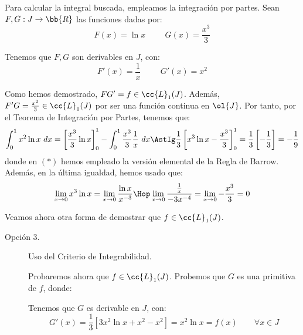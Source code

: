 \begin{ejercicio}
\begin{enumerate}
        Para calcular la integral buscada, empleamos la integración por partes.
        Sean $F,G:J\to \bb{R}$ las funciones dadas por:
        \begin{equation*}
            F(x)=\ln x \hspace{1cm} G(x)=\dfrac{x^3}{3}
        \end{equation*}

        Tenemos que $F,G$ son derivables en $J$, con:
        \begin{equation*}
            F'(x)=\dfrac{1}{x} \hspace{1cm} G'(x)=x^2
        \end{equation*}

        Como hemos demostrado, $FG'=f\in \cc{L}_1(J)$. Además, $F'G=\frac{x^2}{3}\in \cc{L}_1(J)$ por ser una función continua en $\ol{J}$.
        Por tanto, por el Teorema de Integración por Partes, tenemos que:
        \begin{equation*}
            \int_0^1 x^2\ln x~dx
            = \left[\dfrac{x^3}{3}\ln x\right]_0^1 - \int_0^1 \dfrac{x^3}{3}\dfrac{1}{x}~dx
            \AstIg \frac{1}{3}\left[x^3\ln x-\frac{x^3}{3}\right]_0^1
            = \frac{1}{3}\left[-\frac{1}{3}\right] = -\frac{1}{9}
        \end{equation*}
        donde en $(\ast)$ hemos empleado la versión elemental de la Regla de Barrow. Además, en la última igualdad, hemos usado que:
        \begin{equation*}
            \lim_{x\to 0} x^3\ln x = \lim_{x\to 0} \dfrac{\ln x}{x^{-3}} \Hop \lim_{x\to 0} \dfrac{\frac{1}{x}}{-3x^{-4}} = \lim_{x\to 0} -\dfrac{x^3}{3} = 0
        \end{equation*}

        Veamos ahora otra forma de demostrar que $f\in \cc{L}_1(J)$.
        \begin{description}
            \item[Opción 3.] Uso del Criterio de Integrabilidad. 
            
            Probaremos ahora que $f\in \cc{L}_1(J)$.
            Probemos que $G$ es una primitiva de $f$, donde:
            
            Tenemos que $G$ es derivable en $J$, con:
            \begin{equation*}
                G'(x) = \dfrac{1}{3}\left[3x^2\ln x + x^2 - x^2\right] = x^2\ln x = f(x) \qquad \forall x\in J
            \end{equation*}


\end{description}
\end{enumerate}
\end{ejercicio}
